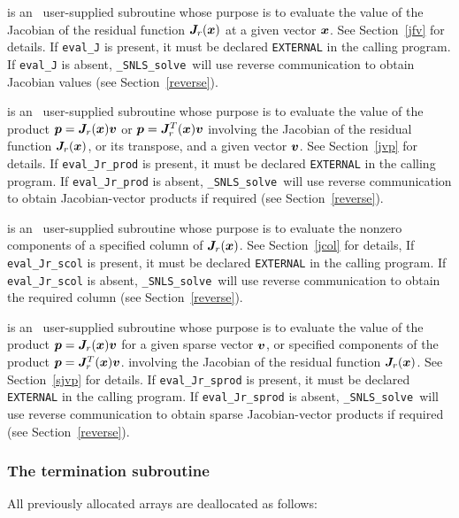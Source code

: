 \documentclass{galahad}
\newcommand{\packagename}{SNLS}
\newcommand{\fullpackagename}{\libraryname\_\packagename}
\newcommand{\solver}{{\tt \fullpackagename\_solve}}
\begin{document}
\begin{description}
 is an \optional\
user-supplied subroutine whose purpose is to evaluate the value of the
Jacobian of the residual function ${\bm{J}}_r({\bm{x}})$ at a given vector ${\bm{x}}$.
See Section~\ref{jfv} for details.
If {\tt eval\_J} is present,
it must be declared {\tt EXTERNAL} in the calling program.
If {\tt eval\_J} is absent, \solver\ will use reverse communication to
obtain Jacobian values (see Section~\ref{reverse}).

 is an \optional\
user-supplied subroutine whose purpose is to evaluate the value of the product
${\bm{p}} = {\bm{J}}_r({\bm{x}}){\bm{v}}$ or ${\bm{p}} = {\bm{J}}_r^T({\bm{x}}){\bm{v}}$ involving the
Jacobian of the residual function ${\bm{J}}_r({\bm{x}})$, or its transpose, and 
a given vector ${\bm{v}}$. See Section~\ref{jvp} for details.
If {\tt eval\_Jr\_prod} is present, it must be declared {\tt EXTERNAL} in the 
calling program. If {\tt eval\_Jr\_prod} is absent, \solver\ will use 
reverse communication to obtain Jacobian-vector products if required 
(see Section~\ref{reverse}).

 is an \optional\
user-supplied subroutine whose purpose is to evaluate the nonzero
components of a specified column of  ${\bm{J}}_r({\bm{x}})$.
See Section~\ref{jcol} for details,
If {\tt eval\_Jr\_scol} is present,
it must be declared {\tt EXTERNAL} in the calling program.
If {\tt eval\_Jr\_scol} is absent, \solver\ will use reverse communication to
obtain the required column (see Section~\ref{reverse}).

\itt{eval\_Jr\_sprod} is an \optional\
user-supplied subroutine whose purpose is to evaluate the value of the product
${\bm{p}} = {\bm{J}}_r({\bm{x}}){\bm{v}}$ for a given sparse vector ${\bm{v}}$, or specified
components of the product ${\bm{p}} = {\bm{J}}_r^T({\bm{x}}){\bm{v}}$. involving the
Jacobian of the residual function ${\bm{J}}_r({\bm{x}})$.
See Section~\ref{sjvp} for details.
If {\tt eval\_Jr\_sprod} is present, it must be declared {\tt EXTERNAL} in the 
calling program. If {\tt eval\_Jr\_sprod} is absent, \solver\ will use 
reverse communication to obtain sparse Jacobian-vector products if required 
(see Section~\ref{reverse}).

\end{description}


\subsubsection{The  termination subroutine}
All previously allocated arrays are deallocated as follows:
\vspace*{1mm}
\end{document}
